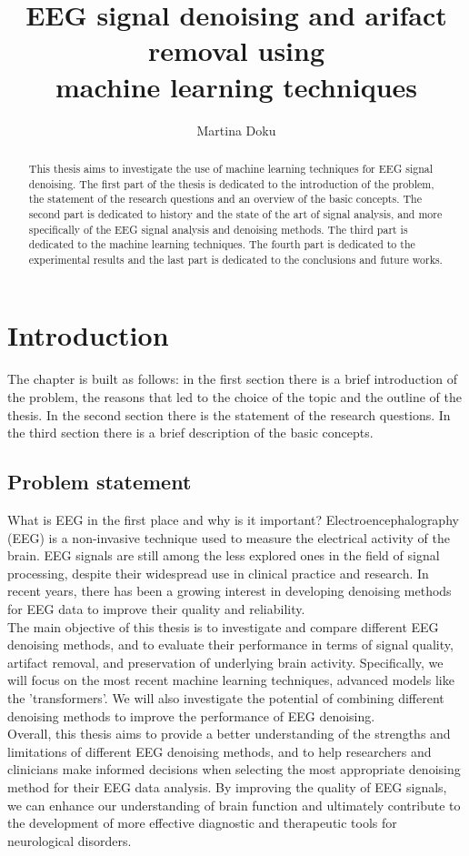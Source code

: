 \documentclass[a4paper]{sapthesis}
\title{EEG signal denoising and arifact removal using \\ machine learning techniques}
\author{Martina Doku}
\begin{document}
\maketitle
\dedication{dedication}
\begin{abstract}
This thesis aims to investigate the use of machine learning
 techniques for EEG signal denoising. The first part of the
thesis is dedicated to the introduction of the problem, the statement
of the research questions and an overview of the basic concepts.
The second part is dedicated to history and 
the state of
the art of signal analysis, and more specifically of the EEG signal
analysis and denoising methods. The third part is dedicated to the
 machine learning techniques.
The fourth part is dedicated to the experimental results and the last part
is dedicated to the conclusions and future works.
\end{abstract}
\tableofcontents
\chapter{Introduction}
The chapter is built as follows: in the first section there is a brief
introduction of the problem, the reasons that led to the choice of the
topic and the outline of the thesis. In the second section there is the
statement of the research questions. In the third section there is a brief
description of the basic concepts.
\section{Problem statement}
What is EEG in the first place and why is it important? Electroencephalography 
(EEG) is a non-invasive technique used to measure the electrical activity of
the brain. EEG signals are still among the less explored ones in the
field of signal processing, despite their widespread use in clinical 
practice and research. In recent years, there has been a growing 
interest in developing denoising methods for EEG data to improve their 
quality and reliability.\newline \\
The main objective of this thesis is to investigate and compare different
 EEG denoising methods, and to evaluate their performance in terms of 
 signal quality, artifact removal, and preservation of underlying brain
activity. Specifically, we will focus on the most recent machine learning
techniques, advanced models like the 'transformers'. We will also investigate the 
potential of combining different denoising methods to improve the 
performance of EEG denoising.\newline \\
Overall, this thesis aims to provide a better understanding of the strengths
 and limitations of different EEG denoising methods, and to help researchers
  and clinicians make informed decisions when selecting the most appropriate
   denoising method for their EEG data analysis. By improving the quality of
    EEG signals, we can enhance our understanding of brain function and 
    ultimately contribute to the development of more effective diagnostic 
    and therapeutic tools for neurological disorders.
\end{document}
